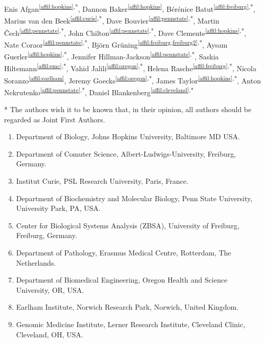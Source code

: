 \setcounter{NAT@ctr}{-1}

{}


Enis Afgan\textsuperscript{\ref{affil:hopkins},*},
Dannon Baker\textsuperscript{\ref{affil:hopkins}},
Bérénice Batut\textsuperscript{\ref{affil:freiburg},*},
Marius van den Beek\textsuperscript{\ref{affil:curie},*},
Dave Bouvier\textsuperscript{\ref{affil:pennstate},*},
Martin Čech\textsuperscript{\ref{affil:pennstate},*},
John Chilton\textsuperscript{\ref{affil:pennstate},*},
Dave Clements\textsuperscript{\ref{affil:hopkins},*},
Nate Coraor\textsuperscript{\ref{affil:pennstate},*},
Björn Grüning\textsuperscript{\ref{affil:freiburg,freiburg2},*},
Aysam Guerler\textsuperscript{\ref{affil:hopkins},*},
Jennifer Hillman-Jackson\textsuperscript{\ref{affil:pennstate},*},
Saskia Hiltemann\textsuperscript{\ref{affil:emc},*},
Vahid Jalili\textsuperscript{\ref{affil:oregon},*},
Helena Rasche\textsuperscript{\ref{affil:freiburg},*},
Nicola Soranzo\textsuperscript{\ref{affil:earlham}},
Jeremy Goecks\textsuperscript{\ref{affil:oregon},*},
James Taylor\textsuperscript{\ref{affil:hopkins},*},
Anton Nekrutenko\textsuperscript{\ref{affil:pennstate},*},
Daniel Blankenberg\textsuperscript{\ref{affil:cleveland},*}

* The authors wish it to be known that, in their opinion, all authors should be regarded as Joint First Authors.

\small
\begin{enumerate}
\itemsep-0.5em
\item Department of Biology, Johns Hopkins University, Baltimore MD USA. \label{affil:hopkins}
\item Department of Comuter Science, Albert-Ludwigs-University, Freiburg, Germany. \label{affil:freiburg}
\item Institut Curie, PSL Research University, Paris, France. \label{affil:curie}
\item Department of Biochemistry and Molecular Biology, Penn State University, University Park, PA, USA. \label{affil:pennstate}
\item Center for Biological Systems Analysis (ZBSA), University of Freiburg, Freiburg, Germany. \label{affil:freiburg2}
\item Department of Pathology, Erasmus Medical Centre, Rotterdam, The Netherlands. \label{affil:emc}
\item Department of Biomedical Engineering, Oregon Health and Science University, OR, USA.\label{affil:oregon}
\item Earlham Institute, Norwich Research Park, Norwich, United Kingdom. \label{affil:earlham}
\item Genomic Medicine Institute, Lerner Research Institute, Cleveland Clinic, Cleveland, OH, USA. \label{affil:cleveland}
\end{enumerate}
\normalsize

